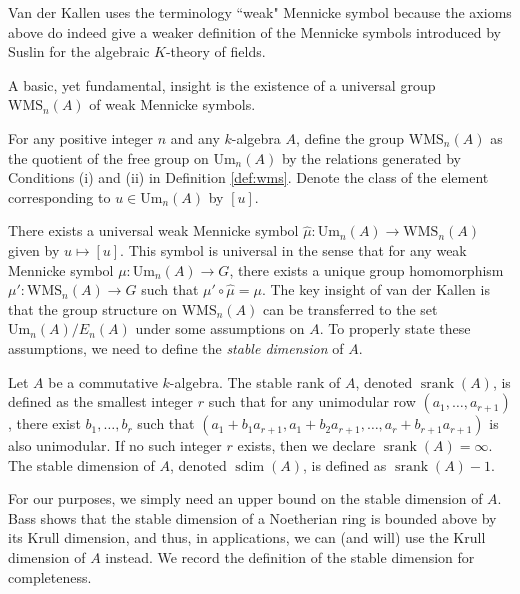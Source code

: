 \begin{remark}
    Van der Kallen uses the terminology ``weak" Mennicke symbol because the axioms above do indeed give a weaker definition of the Mennicke symbols introduced by Suslin \cite{suslin2006mennicke} for the algebraic $K$-theory of fields.
\end{remark}

A basic, yet fundamental, insight is the existence of a universal group $\mathrm{WMS}_n(A)$ of weak Mennicke symbols.

\begin{definition}
    For any positive integer $n$ and any $k$-algebra $A$, define the group $\mathrm{WMS}_n(A)$ as the quotient of the free group on $\mathrm{Um}_n(A)$ by the relations generated by Conditions (i) and (ii) in Definition \ref{def:wms}. Denote the class of the element corresponding to $u\in \mathrm{Um}_n(A)$ by $[u]$.
\end{definition}

There exists a universal weak Mennicke symbol $\hat{\mu}\colon \mathrm{Um}_n(A) \to \mathrm{WMS}_n(A)$ given by $u \mapsto [u]$. This symbol is universal in the sense that for any weak Mennicke symbol $\mu\colon \mathrm{Um}_n(A) \to G$, there exists a unique group homomorphism $\mu'\colon \mathrm{WMS}_n(A) \to G$ such that $\mu' \circ \hat{\mu} = \mu$. The key insight of van der Kallen is that the group structure on $\mathrm{WMS}_n(A)$ can be transferred to the set $\mathrm{Um}_n(A)/E_n(A)$ under some assumptions on $A$. To properly state these assumptions, we need to define the \textit{stable dimension} of $A$.

\begin{definition}
    Let $A$ be a commutative $k$-algebra. The stable rank of $A$, denoted $\operatorname{srank}(A)$, is defined as the smallest integer $r$ such that for any unimodular row $(a_1,\ldots,a_{r+1})$, there exist $b_1,\ldots,b_r$ such that $(a_1 + b_1a_{r+1}, a_1 + b_2a_{r+1},\ldots, a_{r}+b_{r+1}a_{r+1})$ is also unimodular. If no such integer $r$ exists, then we declare $\operatorname{srank}(A) = \infty$. The stable dimension of $A$, denoted $\operatorname{sdim}(A)$, is defined as $\operatorname{srank}(A) - 1$. 
\end{definition}

\begin{remark}
    For our purposes, we simply need an upper bound on the stable dimension of $A$. Bass \cite[Theorem 1]{bass} shows that the stable dimension of a Noetherian ring is bounded above by its Krull dimension, and thus, in applications, we can (and will) use the Krull dimension of $A$ instead. We record the definition of the stable dimension for completeness.
\end{remark}

